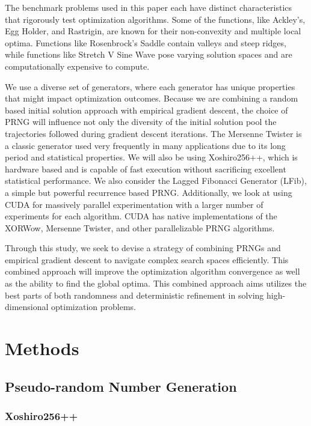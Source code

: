 \documentclass{article}
\begin{document}
        The benchmark problems used in this paper each have distinct characteristics that rigorously test optimization algorithms. Some of the functions, like Ackley’s, Egg Holder, and Rastrigin, are known for their non-convexity and multiple local optima. Functions like Rosenbrock’s Saddle contain valleys and steep ridges, while functions like Stretch V Sine Wave pose varying solution spaces and are computationally expensive to compute.

        We use a diverse set of generators, where each generator has unique properties that might impact optimization outcomes. Because we are combining a random based initial solution approach with empirical gradient descent, the choice of PRNG will influence not only the diversity of the initial solution pool the trajectories followed during gradient descent iterations. The Mersenne Twister is a classic generator used very frequently in many applications due to its long period and statistical properties. We will also be using Xoshiro256++, which is hardware based and is capable of fast execution without sacrificing excellent statistical performance. We also consider the Lagged Fibonacci Generator (LFib), a simple but powerful recurrence based PRNG. Additionally, we look at using CUDA for massively parallel experimentation with a larger number of experiments for each algorithm. CUDA has native implementations of the XORWow, Mersenne Twister, and other parallelizable PRNG algorithms.

        Through this study, we seek to devise a strategy of combining PRNGs and empirical gradient descent to navigate complex search spaces efficiently. This combined approach will improve the optimization algorithm convergence as well as the ability to find the global optima. This combined approach aims utilizes the best parts of both randomness and deterministic refinement in solving high-dimensional optimization problems.

\pagebreak
    \section{Methods}

        \subsection{Pseudo-random Number Generation}

            \subsubsection{Xoshiro256++}
\end{document}
